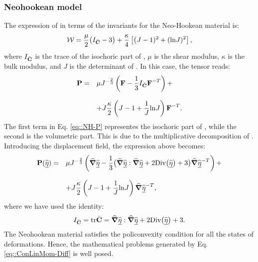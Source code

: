 \subsubsection{Neohookean model} The expression of \W in terms of the
invariants for the Neo-Hookean material is:
\begin{equation}
  \mathcal{W}=\frac{\mu}{2}\big(I_{\bar{\textbf{C}}}-3\big)+\frac{\kappa}{4}\left[\big(J-1)^2
    + (\text{ln}J)^2\right],
  \label{eq::strainNH}
\end{equation}
where $I_{\bar{\textbf{C}}}$ is the trace of the isochoric part of
\C, $\mu$ is the shear modulus, $\kappa$ is the bulk modulus, and $J$
is the determinant of \F. In this case, the tensor \Piola reads:
\begin{equation}
  \begin{array}{lll} \textbf{P} = & \displaystyle \mu
    J^{-\frac{2}{3}}\left(\textbf{F}-\frac{1}{3}I_{\bar{\textbf{C}}}\textbf{F}^{-T}\right) +\\ \\ &
    \displaystyle +
    J\frac{\kappa}{2}\left(J-1+\frac{1}{J}\text{ln}J\right)\textbf{F}^{-T}.
  \end {array}
  \label{eq::NH-P}
\end{equation}
The first term in Eq. \eqref{eq::NH-P} representes the
isochoric part of \Piola, while the second is the volumetric
part. This is due to the multiplicative decomposition of
\F. Introducing the displacement field, the expression above becomes:
\begin{equation}
  \begin{array}{lll} \textbf{P}(\widehat{\underline{\eta}}) = & \displaystyle \mu
    J^{-\frac{2}{3}}\left(\widehat{\boldsymbol{\nabla}}\widehat{\underline{\eta}} -
      \frac{1}{3}\big(\widehat{\boldsymbol{\nabla}}\widehat{\underline{\eta}}:\widehat{\boldsymbol{\nabla}}\widehat{\underline{\eta}}+2\text{Div}\big(\widehat{\underline{\eta}}\big)+3\big)
      \widehat{\boldsymbol{\nabla}}\widehat{\underline{\eta}}^{-T}\right)+\\
    \\ & \displaystyle +
    J\frac{\kappa}{2}\left(J-1+\frac{1}{J}\text{ln}J\right)\widehat{\boldsymbol{\nabla}}\widehat{\underline{\eta}}^{-T},
  \end{array}
  \label{eq::NH-P-displ}
\end{equation}
where we have used the identity:
\begin{equation} I_{\bar{\textbf{C}}}=\text{tr}\bar{\textbf{C}}=\widehat{\boldsymbol{\nabla}}\widehat{\underline{\eta}}:\widehat{\boldsymbol{\nabla}}\widehat{\underline{\eta}}
  + 2\text{Div}\big(\widehat{\underline{\eta}}\big)+3.
  \label{eq::Id-trC-displ}
\end{equation}
The Neohookean material satisfies the policonvexity
condition for all the states of deformations. Hence, the mathematical
problems generated by Eq. \eqref{eq::ConLinMom-Diff} is well posed.

